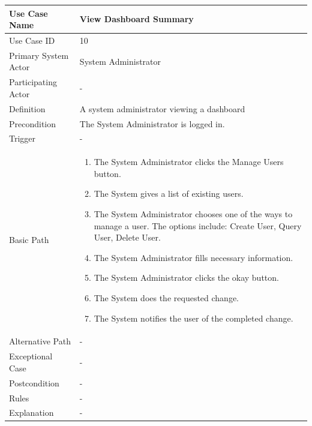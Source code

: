 \documentclass[a4paper,12pt]{report}
\begin{document}
		\begin{tabular}{|m{4cm}|m{11.5cm}|}
			\hline
				Use Case Name & View Dashboard Summary\\
			\hline
				Use Case ID & 10\\
			\hline
				Primary System Actor & System Administrator\\
			\hline
				Participating Actor & -\\
			\hline
				Definition & A system administrator viewing a dashboard \\
			\hline
				Precondition & The System Administrator is logged in.\\
			\hline
				Trigger & -\\
			\hline
				Basic Path & \begin{enumerate}
					\item The System Administrator clicks the Manage Users button.
					\item The System gives a list of existing users.
					\item The System Administrator chooses one of the ways to manage a user. The options include: Create User, Query User, Delete User.
					\item The System Administrator fills necessary information.
					\item The System Administrator clicks the okay button.
					\item The System does the requested change.
					\item The System notifies the user of the completed change.
				\end{enumerate}		
				\\
			\hline
				Alternative Path & -\\
			\hline
				Exceptional Case & -\\
			\hline
				Postcondition & -\\
			\hline
				Rules & -\\
			\hline
				Explanation & -\\
			\hline
		\end{tabular}
\end{document}

